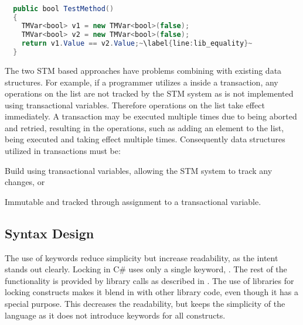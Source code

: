 \begin{lstlisting}[float, label=lst:lib_implicit_conversion,
  caption={Equality comparison of \bscode{TMVar<bool>}},
  language=Java,  
  showspaces=false,
  showtabs=false,
  breaklines=true,
  showstringspaces=false,
  breakatwhitespace=true,
  escapechar=~,
  commentstyle=\color{greencomments},
  keywordstyle=\color{bluekeywords},
  stringstyle=\color{redstrings},
  morekeywords={atomic, retry, orelse, var, get, set, ref, out, bool}]  % Start your code-block

  public bool TestMethod()
  {
    TMVar<bool> v1 = new TMVar<bool>(false);
    TMVar<bool> v2 = new TMVar<bool>(false);
    return v1.Value == v2.Value;~\label{line:lib_equality}~
  }
\end{lstlisting}

The two \ac{STM} based approaches have problems combining with existing data structures. For example, if a programmer utilizes a  inside a transaction, any operations on the list are not tracked by the \ac{STM} system as  is not implemented using transactional variables. Therefore operations on the list take effect immediately. A transaction may be executed multiple times due to being aborted and retried, resulting in the operations, such as adding an element to the list, being executed and taking effect multiple times. Consequently data structures utilized in transactions must be: \begin{inparaenum}
  \item Build using transactional variables, allowing the \ac{STM} system to track any changes, or
  \item Immutable and tracked through assignment to a transactional variable.
\end{inparaenum}  

\subsection{Syntax Design}\label{subsec:syntaxdesign}
The use of keywords reduce simplicity but increase readability, as the intent stands out clearly\cite[p. 12-13]{sebestaProLang}. Locking in C\# uses only a single keyword, . The rest of the functionality is provided by library calls as described in . The use of libraries for locking constructs makes it blend in with other library code, even though it has a special purpose. This decreases the readability, but keeps the simplicity of the language as it does not introduce keywords for all constructs. 

